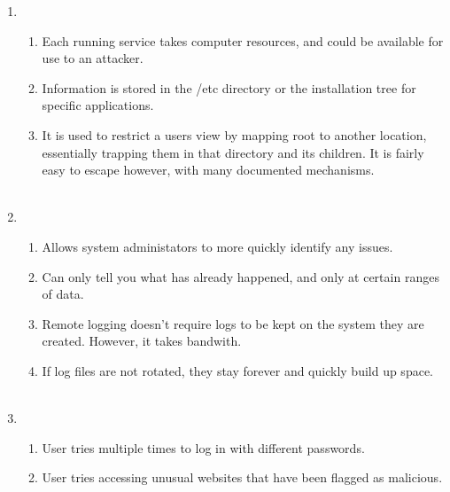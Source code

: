 \documentclass[12pt]{article}
\begin{document}
\begin{enumerate}
    \item\begin{enumerate}
	\item Each running service takes computer resources, and could be available for use to an attacker.
	\item Information is stored in the /etc directory or the installation tree for specific applications.
	\item It is used to restrict a users view by mapping root to another location, essentially trapping them in that directory and its children. It is fairly easy to escape however, with many 		documented mechanisms.\\\\
   	\end{enumerate}
   	
    \item\begin{enumerate}
	\item Allows system administators to more quickly identify any issues.
	\item Can only tell you what has already happened, and only at certain ranges of data.
	\item Remote logging doesn't require logs to be kept on the system they are created. However, it takes bandwith.
	\item If log files are not rotated, they stay forever and quickly build up space.\\\\
   	\end{enumerate}

    \item \begin{enumerate}
	\item User tries multiple times to log in with different passwords.
	\item User tries accessing unusual websites that have been flagged as malicious.
   	\end{enumerate}
\end{enumerate}
\end{document}
